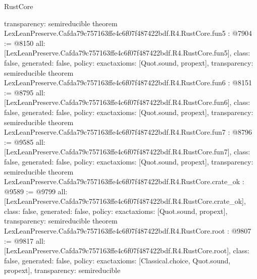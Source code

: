 \begin{lexlean}{RustCore}
\begin{coremodule}
{  transparency: semireducible
}
theorem LexLeanPreserve.Cafda79c757163ffe4c6f07f487422bdf.R4.RustCore.fun5 : @7904 := @8150 {
  all: [LexLeanPreserve.Cafda79c757163ffe4c6f07f487422bdf.R4.RustCore.fun5],
  class: false,
  generated: false,
  policy: exact{axioms: [Quot.sound, propext]},
  transparency: semireducible
}
theorem LexLeanPreserve.Cafda79c757163ffe4c6f07f487422bdf.R4.RustCore.fun6 : @8151 := @8795 {
  all: [LexLeanPreserve.Cafda79c757163ffe4c6f07f487422bdf.R4.RustCore.fun6],
  class: false,
  generated: false,
  policy: exact{axioms: [Quot.sound, propext]},
  transparency: semireducible
}
theorem LexLeanPreserve.Cafda79c757163ffe4c6f07f487422bdf.R4.RustCore.fun7 : @8796 := @9585 {
  all: [LexLeanPreserve.Cafda79c757163ffe4c6f07f487422bdf.R4.RustCore.fun7],
  class: false,
  generated: false,
  policy: exact{axioms: [Quot.sound, propext]},
  transparency: semireducible
}
theorem LexLeanPreserve.Cafda79c757163ffe4c6f07f487422bdf.R4.RustCore.crate_ok : @9589 := @9799 {
  all: [LexLeanPreserve.Cafda79c757163ffe4c6f07f487422bdf.R4.RustCore.crate_ok],
  class: false,
  generated: false,
  policy: exact{axioms: [Quot.sound, propext]},
  transparency: semireducible
}
theorem LexLeanPreserve.Cafda79c757163ffe4c6f07f487422bdf.R4.RustCore.root : @9807 := @9817 {
  all: [LexLeanPreserve.Cafda79c757163ffe4c6f07f487422bdf.R4.RustCore.root],
  class: false,
  generated: false,
  policy: exact{axioms: [Classical.choice, Quot.sound, propext]},
  transparency: semireducible
}


\end{coremodule}
\end{lexlean}
